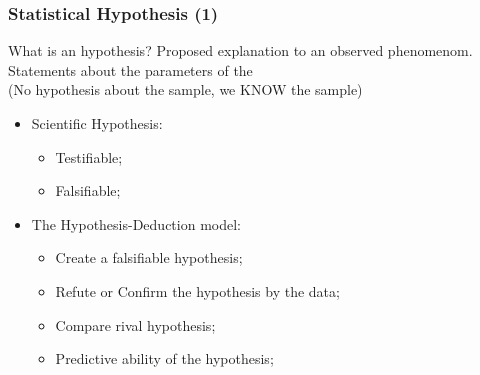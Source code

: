 \documentclass[10pt]{beamer}
\begin{document}
\begin{frame}
\frametitle{Statistical Hypothesis (1)}

\begin{block}{What is an hypothesis?}
  Proposed explanation to an observed phenomenom.\\
  \smallskip
  Statements about the parameters of the \\
  (No hypothesis about the sample, we KNOW the sample)
\end{block}

\begin{itemize}
  \item Scientific Hypothesis:
    \begin{itemize}
      \item Testifiable;
      \item Falsifiable;
    \end{itemize}
    \bigskip

  \item The Hypothesis-Deduction model: 
    \begin{itemize}
      \item Create a falsifiable hypothesis;
      \item Refute or Confirm the hypothesis by the data;
      \item Compare rival hypothesis;
      \item Predictive ability of the hypothesis;
    \end{itemize}
\end{itemize}
\end{frame}
\end{document}
